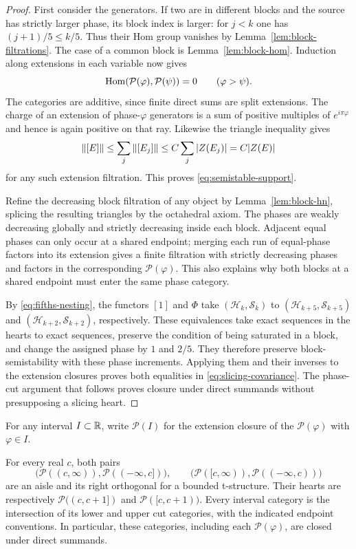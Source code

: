 \begin{proof}
First consider the generators.  If two are in different blocks and the
source has strictly larger phase, its block index is larger: for $j<k$
one has $(j+1)/5\le k/5$.  Thus their Hom group vanishes by
Lemma~\ref{lem:block-filtrations}.  The case of a common block is
Lemma~\ref{lem:block-hom}.  Induction along extensions in each variable
now gives
\[
 \operatorname{Hom}(\mathcal P(\varphi),\mathcal P(\psi))=0
 \qquad(\varphi>\psi).
\]
The categories are additive, since finite direct sums are split
extensions.  The charge of an extension of phase-$\varphi$ generators
is a sum of positive multiples of $e^{i\pi\varphi}$ and hence is again
positive on that ray.  Likewise the triangle inequality gives
\[
 \left\lVert[E]\right\rVert\le\sum_j\left\lVert[E_j]\right\rVert
 \le C\sum_j|Z(E_j)|=C|Z(E)|
\]
for any such extension filtration.  This proves
\eqref{eq:semistable-support}.

Refine the decreasing block filtration of any object by
Lemma~\ref{lem:block-hn}, splicing the resulting triangles by the
octahedral axiom.  The phases are weakly decreasing globally and strictly
decreasing inside each block.  Adjacent equal phases can only occur at a
shared endpoint; merging each run of equal-phase factors into its
extension gives a finite filtration with strictly decreasing phases and
factors in the corresponding $\mathcal P(\varphi)$.  This also explains
why both blocks at a shared endpoint must enter the same phase category.

By \eqref{eq:fifths-nesting}, the functors $[1]$ and $\Phi$ take
$(\mathcal H_k,\mathcal S_k)$ to
$(\mathcal H_{k+5},\mathcal S_{k+5})$ and
$(\mathcal H_{k+2},\mathcal S_{k+2})$, respectively.  These equivalences
take exact sequences in the hearts to exact sequences, preserve the
condition of being saturated in a block, and change the assigned phase
by $1$ and $2/5$.  They therefore preserve block-semistability with these
phase increments.  Applying them and their inverses to the extension
closures proves both equalities in \eqref{eq:slicing-covariance}.
The phase-cut argument that follows proves closure under direct
summands without presupposing a slicing heart.
\end{proof}

For any interval $I\subset\mathbb R$, write $\mathcal P(I)$ for the extension
closure of the $\mathcal P(\varphi)$ with $\varphi\in I$.

\begin{lemma}\label{lem:phase-cuts}
For every real $c$, both pairs
\begin{equation}\label{eq:phase-cuts}
 \bigl(\mathcal P((c,\infty)),\mathcal P((-\infty,c])\bigr),
 \qquad
 \bigl(\mathcal P([c,\infty)),\mathcal P((-\infty,c))\bigr)
\end{equation}
are an aisle and its right orthogonal for a bounded t-structure.
Their hearts are respectively
$\mathcal P((c,c+1])$ and $\mathcal P([c,c+1))$.
Every interval category is the intersection of its lower and upper cut
categories, with the indicated endpoint conventions.  In particular,
these categories, including each $\mathcal P(\varphi)$, are closed under
direct summands.
\end{lemma}

